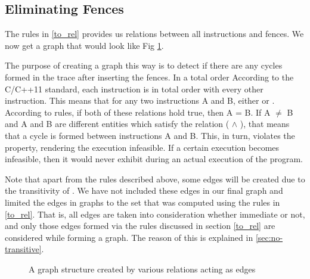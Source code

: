 \subsection{Eliminating Fences}
The rules in \textsection\ref{to_rel} provides us \setTO relations between all 
instructions and fences. We now get a graph that would look 
like Fig \ref{fig:cycles}. 


\par
The purpose of creating a graph this way is to detect if there are any cycles 
formed in the trace after inserting the fences. 
In a total order 
According to the C/C++11 standard, each \mosc instruction is in total order 
with every other \mosc instruction. This means that for any two \mosc 
instructions A and B, either  or . According to 
\setTO rules, if both of these relations hold true, then A = B. 
If A $\neq$ B and A and B are different entities which satisfy the 
relation ( $\land$ ), that means that a cycle is 
formed between instructions A and B. This, in turn, violates the \setTO 
property, rendering the execution infeasible. If a certain execution 
becomes infeasible, then it would never exhibit during an actual execution 
of the program.

Note that apart from the rules described above, some \setTO edges 
will be created due to the transitivity of \setTO.
We have not included these edges in our final graph and limited 
the edges in graphs to the set that was computed using the rules 
in \textsection\ref{to_rel}. That is, all \setSB edges are taken into 
consideration whether immediate 
or not, and only those edges formed via the \setTO rules discussed in 
section \textsection\ref{to_rel} are considered while forming a graph. 
The reason of this is explained in \textsection\ref{sec:no-transitive}.


\begin{figure}
\begin{center}
	
	\caption{A graph structure created by various relations acting as edges}
	\label{fig:cycles}
\end{center}
\end{figure}


